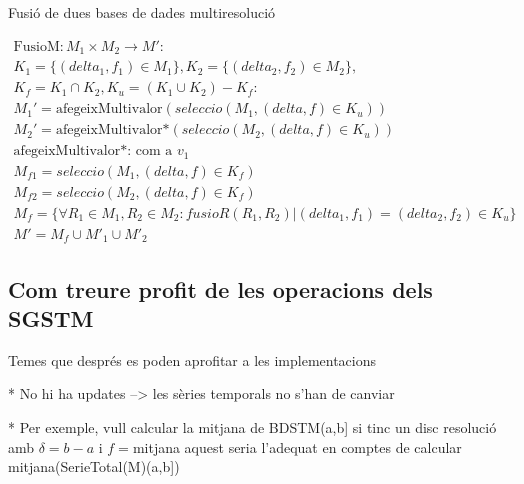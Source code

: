 Fusió de dues bases de dades multiresolució

\begin{gather*}
    \text{FusioM}: M_1 \times M_2 \longrightarrow M': \\
    K_1 = \{(delta_1,f_1) \in M_1\},K_2 = \{(delta_2,f_2) \in M_2\}, \\
    K_f = K_1 \cap K_2, K_u =  (K_1 \cup K_2) - K_f : \\
    M_1'=\text{afegeixMultivalor}(seleccio(M_1, (delta,f) \in K_u))\\
    M_2'=\text{afegeixMultivalor*} (seleccio(M_2, (delta,f) \in K_u))\\
    \text{afegeixMultivalor*: com a }v_1\\
    M_{f1} = seleccio(M_1, (delta,f) \in K_f) \\
    M_{f2} = seleccio(M_2, (delta,f) \in K_f) \\
    M_f = \{\forall R_1\in M_1,R_2\in M_2: fusioR(R_1,R_2) |
       (delta_1,f_1) = (delta_2,f_2) \in K_u  \} \\
    M' =  M_{f} \cup  M'_{1}  \cup  M'_{2}     
\end{gather*} 




\subsection{Com treure profit de les operacions dels SGSTM}

Temes que després es poden aprofitar a les implementacions

* No hi ha updates --> les sèries temporals no s'han de canviar

* Per exemple, vull calcular la mitjana de  BDSTM(a,b] si tinc un disc resolució amb $\delta=b-a$ i $f=$mitjana aquest seria l'adequat en comptes de calcular mitjana(SerieTotal(M)(a,b])











